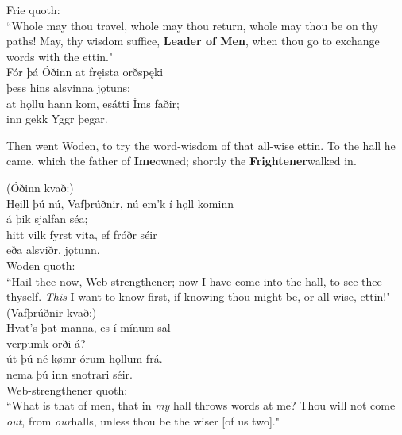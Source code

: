 \bvb Frie quoth: \\ “Whole may thou travel, whole may thou return, whole may thou be on thy paths! May, thy wisdom suffice, \textbf{Leader of Men}, when thou go to exchange words with the ettin." \\

\bva Fór þá Óðinn \hld at fręista orðspęki \\%
þess hins alsvinna jǫtuns; \\%
at hǫllu hann kom, \hld es\footnotemark[1] átti Íms faðir; \\%
inn gekk Yggr þegar.\\%

\bvb Then went Woden, to try the word-wisdom of that all-wise ettin. To the hall he came, which the father of \textbf{Ime}\footnotemark[5] owned; shortly the \textbf{Frightener}\footnotemark[6] walked in. \\

(Óðinn kvað:) \\%
\bva Hęill þú nú, Vafþrúðnir, \hld nú em'k í hǫll kominn \\%
á þik sjalfan séa; \\%
hitt vilk fyrst vita, \hld ef fróðr séir \\%
eða alsviðr, jǫtunn.\\%

\bvb Woden quoth: \\ “Hail thee now, Web-strengthener; now I have come into the hall, to see thee thyself. \emph{This} I want to know first, if knowing thou might be, or all-wise, ettin!" \\

(Vafþrúðnir kvað:) \\%
\bva Hvat's þat manna, \hld es í mínum sal \\%
verpumk orði á? \\%
út þú né kømr \hld órum hǫllum frá. \\%
nema þú inn snotrari séir.\\%

\bvb Web-strengthener quoth: \\ “What is that of men\footnotemark[10], that in \emph{my} hall throws words at me? Thou will not come \emph{out}, from \emph{our}\footnotemark[11] halls, unless thou be the wiser [of us two]." \\


